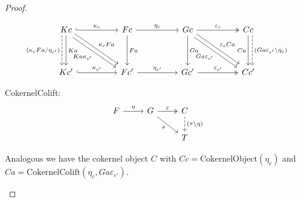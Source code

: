 \begin{proof}
\begin{enumerate}
\begin{subproof}
\[
\begin{tikzcd}
Kc \arrow[dd, "Ka"] \arrow[rr, "\kappa_{c}", hook] \arrow[rrdd, "\kappa_{c}Fa", shift left] \arrow[rrdd, "Ka\kappa_{c'}"', shift right] \arrow[dd, "(\kappa_{c}Fa/\eta_{c'})"', dashed, shift right=2] &  & Fc \arrow[rr, "\eta_{c}"] \arrow[dd, "Fa"] &  & Gc \arrow[dd, "Ga"] \arrow[rr, "\varepsilon_{c}", two heads] \arrow[rrdd, "Ga\varepsilon_{c'}"', shift right] \arrow[rrdd, "\varepsilon_{c}Ca", shift left] &  & Cc \arrow[dd, "Ca"'] \arrow[dd, "(Ga\varepsilon_{c'}\backslash \eta_{c})", dashed, shift left=2] \\
                                                                                                                                                                                                       &  &                                            &  &                                                                                                                                                             &  &                                                                                                  \\
Kc' \arrow[rr, "\kappa_{c'}", hook]                                                                                                                                                                    &  & Fc' \arrow[rr, "\eta_{c'}"]                &  & Gc' \arrow[rr, "\varepsilon_{c'}", two heads]                                                                                                               &  & Cc'                                                                                             
\end{tikzcd}
\]


CokernelColift:
\[
\begin{tikzcd}
F \arrow[r, "\eta"] & G \arrow[r, "\varepsilon", two heads] \arrow[rd, "\tau"'] & C \arrow[d, "(\tau\backslash\eta)", dashed]                                           \\
                    &                                                & T 
\end{tikzcd}
\]


Analogous we have the cokernel object $C$ with $Cc = \mathrm{CokernelObject}(\eta_{c})$ and
$Ca = \mathrm{CokernelColift}(\eta_{c}, Ga\varepsilon_{c'})$.



\end{subproof}


\end{enumerate}
\end{proof}
